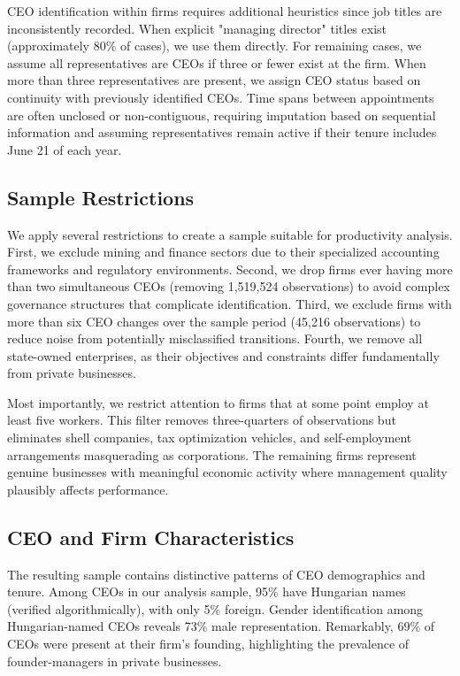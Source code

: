 \documentclass[11pt,a4paper]{article}
\begin{document}
CEO identification within firms requires additional heuristics since job titles are inconsistently recorded. When explicit "managing director" titles exist (approximately 80\% of cases), we use them directly. For remaining cases, we assume all representatives are CEOs if three or fewer exist at the firm. When more than three representatives are present, we assign CEO status based on continuity with previously identified CEOs. Time spans between appointments are often unclosed or non-contiguous, requiring imputation based on sequential information and assuming representatives remain active if their tenure includes June 21 of each year.

\subsection{Sample Restrictions}

We apply several restrictions to create a sample suitable for productivity analysis. First, we exclude mining and finance sectors due to their specialized accounting frameworks and regulatory environments. Second, we drop firms ever having more than two simultaneous CEOs (removing 1,519,524 observations) to avoid complex governance structures that complicate identification. Third, we exclude firms with more than six CEO changes over the sample period (45,216 observations) to reduce noise from potentially misclassified transitions. Fourth, we remove all state-owned enterprises, as their objectives and constraints differ fundamentally from private businesses.

Most importantly, we restrict attention to firms that at some point employ at least five workers. This filter removes three-quarters of observations but eliminates shell companies, tax optimization vehicles, and self-employment arrangements masquerading as corporations. The remaining firms represent genuine businesses with meaningful economic activity where management quality plausibly affects performance.

\subsection{CEO and Firm Characteristics}

The resulting sample contains distinctive patterns of CEO demographics and tenure. Among CEOs in our analysis sample, 95\% have Hungarian names (verified algorithmically), with only 5\% foreign. Gender identification among Hungarian-named CEOs reveals 73\% male representation. Remarkably, 69\% of CEOs were present at their firm's founding, highlighting the prevalence of founder-managers in private businesses.
\end{document}
